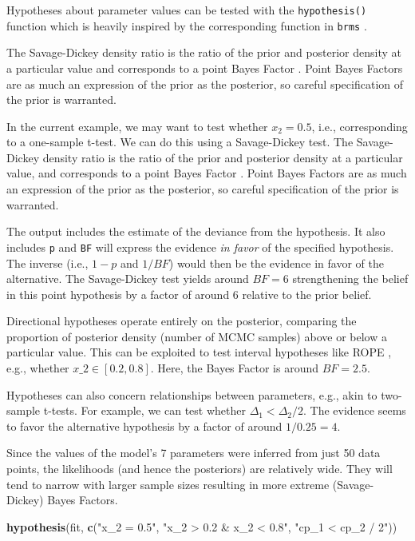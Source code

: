 \documentclass[
  american,
]{article}
\newenvironment{Shaded}{\begin{snugshade}}{\end{snugshade}}
\newcommand{\KeywordTok}[1]{\textcolor[rgb]{0.13,0.29,0.53}{\textbf{#1}}}
\newcommand{\NormalTok}[1]{#1}
\newcommand{\StringTok}[1]{\textcolor[rgb]{0.31,0.60,0.02}{#1}}
\begin{document}
Hypotheses about parameter values can be tested with the \texttt{hypothesis()} function which is heavily inspired by the corresponding function in \texttt{brms} \citep{burkner2017}.

The Savage-Dickey density ratio is the ratio of the prior and posterior density at a particular value and corresponds to a point Bayes Factor \citep{verdinelli1995}. Point Bayes Factors are as much an expression of the prior as the posterior, so careful specification of the prior is warranted.

In the current example, we may want to test whether \(x_2 = 0.5\), i.e., corresponding to a one-sample t-test. We can do this using a Savage-Dickey test. The Savage-Dickey density ratio is the ratio of the prior and posterior density at a particular value, and corresponds to a point Bayes Factor \citep{verdinelli1995}. Point Bayes Factors are as much an expression of the prior as the posterior, so careful specification of the prior is warranted.

The output includes the estimate of the deviance from the hypothesis. It also includes \texttt{p} and \texttt{BF} will express the evidence \emph{in favor} of the specified hypothesis. The inverse (i.e., \(1 - p\) and \(1 / BF\)) would then be the evidence in favor of the alternative. The Savage-Dickey test yields around \(BF = 6\) strengthening the belief in this point hypothesis by a factor of around 6 relative to the prior belief.

Directional hypotheses operate entirely on the posterior, comparing the proportion of posterior density (number of MCMC samples) above or below a particular value. This can be exploited to test interval hypotheses like ROPE \citep{kruschke2011}, e.g., whether \(x\_2 \in [0.2, 0.8]\). Here, the Bayes Factor is around \(BF = 2.5\).

Hypotheses can also concern relationships between parameters, e.g., akin to two-sample t-tests. For example, we can test whether \(\Delta_1 < \Delta_2 / 2\). The evidence seems to favor the alternative hypothesis by a factor of around \(1 / 0.25 = 4\).

Since the values of the model's 7 parameters were inferred from just 50 data points, the likelihoods (and hence the posteriors) are relatively wide. They will tend to narrow with larger sample sizes resulting in more extreme (Savage-Dickey) Bayes Factors.

\begin{Shaded}
\begin{Highlighting}[]
\KeywordTok{hypothesis}\NormalTok{(fit, }\KeywordTok{c}\NormalTok{(}\StringTok{"x_2 = 0.5"}\NormalTok{, }
                  \StringTok{"x_2 > 0.2 & x_2 < 0.8"}\NormalTok{,}
                  \StringTok{"cp_1 < cp_2 / 2"}\NormalTok{))}
\end{Highlighting}
\end{Shaded}
\end{document}
